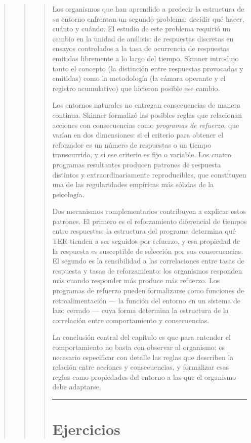 \documentclass[
  letterpaper,
  DIV=11,
  numbers=noendperiod]{scrreprt}
\begin{document}
\begin{tcolorbox}[enhanced jigsaw, arc=.35mm, bottomrule=.15mm, breakable, colback=white, colframe=quarto-callout-note-color-frame, left=2mm, leftrule=.75mm, opacityback=0, rightrule=.15mm, toprule=.15mm]
\begin{quote}
\begin{quote}
\begin{quote}
Los organismos que han aprendido a predecir la estructura de su entorno
enfrentan un segundo problema: decidir qué hacer, cuánto y cuándo. El
estudio de este problema requirió un cambio en la unidad de análisis: de
respuestas discretas en ensayos controlados a la tasa de ocurrencia de
respuestas emitidas libremente a lo largo del tiempo. Skinner introdujo
tanto el concepto (la distinción entre respuestas provocadas y emitidas)
como la metodología (la cámara operante y el registro acumulativo) que
hicieron posible ese cambio.

Los entornos naturales no entregan consecuencias de manera continua.
Skinner formalizó las posibles reglas que relacionan acciones con
consecuencias como \emph{programas de refuerzo}, que varían en dos
dimensiones: si el criterio para obtener el reforzador es un número de
respuestas o un tiempo transcurrido, y si ese criterio es fijo o
variable. Los cuatro programas resultantes producen patrones de
respuesta distintos y extraordinariamente reproducibles, que constituyen
una de las regularidades empíricas más sólidas de la psicología.

Dos mecanismos complementarios contribuyen a explicar estos patrones. El
primero es el reforzamiento diferencial de tiempos entre respuestas: la
estructura del programa determina qué TER tienden a ser seguidos por
refuerzo, y esa propiedad de la respuesta es susceptible de selección
por sus consecuencias. El segundo es la sensibilidad a las correlaciones
entre tasas de respuesta y tasas de reforzamiento: los organismos
responden más cuando responder más produce más refuerzo. Los programas
de refuerzo pueden formalizarse como funciones de retroalimentación ---
la función del entorno en un sistema de lazo cerrado --- cuya forma
determina la estructura de la correlación entre comportamiento y
consecuencias.

La conclusión central del capítulo es que para entender el
comportamiento no basta con observar al organismo: es necesario
especificar con detalle las reglas que describen la relación entre
acciones y consecuencias, y formalizar esas reglas como propiedades del
entorno a las que el organismo debe adaptarse.

\begin{center}\rule{0.5\linewidth}{0.5pt}\end{center}

\mbox{}%
\section{Ejercicios}\label{ejercicios-5}


\end{quote}
\end{quote}
\end{quote}
\end{tcolorbox}
\end{document}
